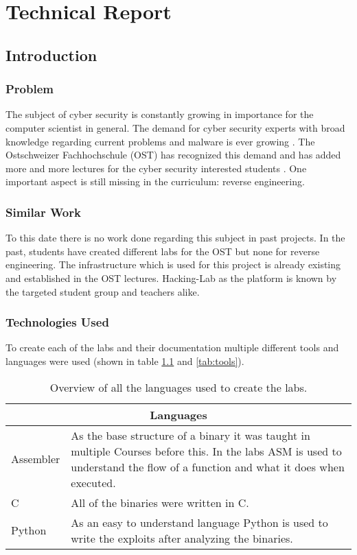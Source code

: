 \chapter{Technical Report}
\section{Introduction}
\subsection{Problem}
The subject of cyber security is constantly growing in importance for the computer scientist in general. The demand for cyber security experts with broad knowledge regarding current problems and malware is ever growing \cite{cybercrime-mag}. The Ostschweizer Fachhochschule (OST) has recognized this demand and has added more and more lectures for the cyber security interested students \cite{ost-cybersec}. One important aspect is still missing in the curriculum: reverse engineering.

\subsection{Similar Work}
To this date there is no work done regarding this subject in past projects. In the past, students have created different labs for the OST but none for reverse engineering. The infrastructure which is used for this project is already existing and established in the OST lectures. Hacking-Lab as the platform is known by the targeted student group and teachers alike. 

\subsection{Technologies Used}
To create each of the labs and their documentation multiple different tools and languages were used (shown in table \ref{tab:languages} and \ref{tab:tools}). 
\begin{center}
    \begin{table}[H]
        \centering
        \begin{tabular}{ |p{4.1cm}|p{10cm}| } 
            \hline
            \multicolumn{2}{||c||}{\textbf{Languages}} \\
            \hline
            \hline
                Assembler & As the base structure of a binary it was taught in multiple Courses before this. In the labs ASM is used to understand the flow of a function and what it does when executed. \\
            \hline
                C & All of the binaries were written in C.   \\
            \hline
                Python & As an easy to understand language Python is used to write the exploits after analyzing the binaries. \\
            \hline
        \end{tabular}
        \caption{Overview of all the languages used to create the labs.}
        \label{tab:languages}
    \end{table}
\end{center}

